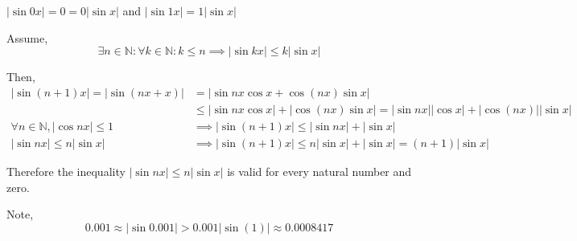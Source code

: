 \documentclass{article}
\newcommand\N{\mathbb{N}}
\begin{document}
$|\sin 0x| = 0 =  0|\sin x|$ and  $|\sin 1x| = 1|\sin x|$

Assume,\[\exists n\in \N: \forall k\in\N: k\leq n \implies |\sin kx|
  \leq  k|\sin x|\]

Then,
\begin{align*} |\sin (n+1)x|  = |\sin (nx + x)| &= |\sin nx\cos x + \cos(nx)\sin x|\\
  &\leq |\sin nx\cos x| + |\cos(nx)\sin x| = |\sin nx||\cos x| +
                               |\cos(nx)||\sin x|\\
  \forall n \in \N, |\cos nx|\leq 1 &\implies |\sin(n+1)x|\leq |\sin nx| +
                                      |\sin x| \\
  |\sin nx|
  \leq  n|\sin x|&\implies |\sin (n+1)x| \leq n|\sin x| +
                   |\sin x| = (n+1)|\sin x|\end{align*}

Therefore the inequality $|\sin nx|\leq n|\sin x|$ is valid for every
natural number and zero.

Note, \[0.001 \approx |\sin 0.001| > 0.001|\sin(1)| \approx 0.0008417\]
\end{document}
